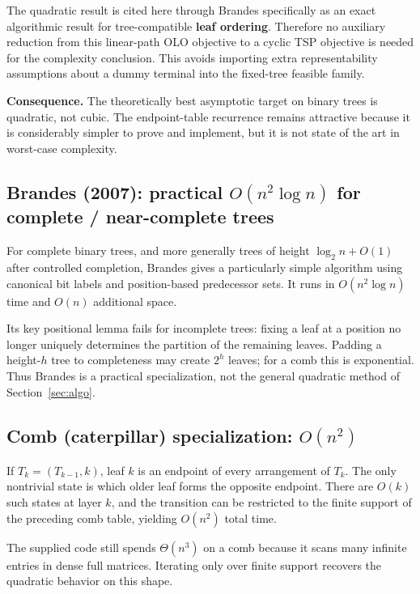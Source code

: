\documentclass[11pt]{article}
\theoremstyle{plain}
\begin{document}
The quadratic result is cited here through Brandes specifically as an exact
algorithmic result for tree-compatible \textbf{leaf ordering}. Therefore no
auxiliary reduction from this linear-path OLO objective to a cyclic TSP
objective is needed for the complexity conclusion. This avoids importing extra
representability assumptions about a dummy terminal into the fixed-tree
feasible family.

\textbf{Consequence.} The theoretically best asymptotic target on binary trees
is quadratic, not cubic. The endpoint-table recurrence remains attractive
because it is considerably simpler to prove and implement, but it is not state
of the art in worst-case complexity.

\subsection{Brandes (2007): practical \(O(n^2\log n)\) for complete /
near-complete trees}

For complete binary trees, and more generally trees of height
\(\log_2 n+O(1)\) after controlled completion, Brandes gives a particularly
simple algorithm using canonical bit labels and position-based predecessor
sets. It runs in \(O(n^2\log n)\) time and \(O(n)\) additional space.

Its key positional lemma fails for incomplete trees: fixing a leaf at a position
no longer uniquely determines the partition of the remaining leaves. Padding a
height-\(h\) tree to completeness may create \(2^h\) leaves; for a comb this is
exponential. Thus Brandes is a practical specialization, not the general
quadratic method of Section~\ref{sec:algo}.

\subsection{Comb (caterpillar) specialization: \(O(n^2)\)}
\label{sec:comb}

If \(T_k=(T_{k-1},k)\), leaf \(k\) is an endpoint of every arrangement of
\(T_k\). The only nontrivial state is which older leaf forms the opposite
endpoint. There are \(O(k)\) such states at layer \(k\), and the transition can
be restricted to the finite support of the preceding comb table, yielding
\(O(n^2)\) total time.

The supplied code still spends \(\Theta(n^3)\) on a comb because it scans many
infinite entries in dense full matrices. Iterating only over finite support
recovers the quadratic behavior on this shape.
\end{document}
